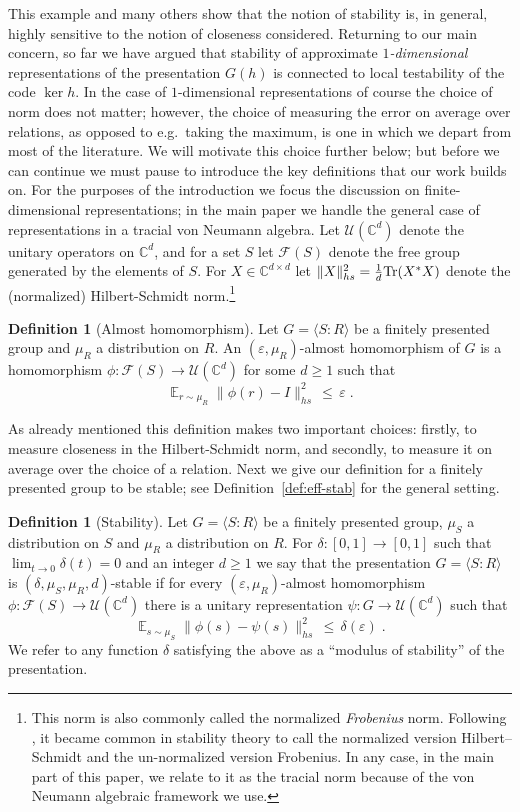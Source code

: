 \documentclass[11pt]{article}
\theoremstyle{definition}
\newtheorem{definition}[theorem]{Definition}
\newcommand{\Tr}{\mbox{\rm Tr}}
\newcommand{\Id}{\ensuremath{I}}
\DeclareMathOperator*{\Expectation}{\mathbb{E}}
\newcommand{\Es}[1]{\Expectation_{#1}}
\newcommand{\C}{\ensuremath{\mathbb{C}}}
\newcommand{\mF}{\ensuremath{\mathcal{F}}}
\newcommand{\mU}{\ensuremath{\mathcal{U}}}
\newcommand{\eps}{\varepsilon}
\begin{document}
This example and many others show that the notion of stability is, in general, highly sensitive to the notion of closeness considered. Returning to our main concern, so far we have argued that 
stability of approximate \emph{$1$-dimensional} representations of the presentation $G(h)$ is connected to local testability of the code $\ker h$. In the case of $1$-dimensional representations of course the choice of norm does not matter; however, the choice of measuring the error on average over relations, as opposed to e.g.\ taking the maximum, is one in which we depart from most of the literature. We will motivate this choice further below; but before we can continue we must pause to introduce the key definitions that our work builds on. For the purposes of the introduction we focus the discussion on finite-dimensional representations; in the main paper we handle the general case of representations in a tracial von Neumann algebra. Let $\mU(\C^d)$ denote the unitary operators on $\C^d$, and for a set $S$ let $\mF(S)$ denote the free group generated by the elements of $S$. For $X\in \C^{d\times d}$ let $\|X\|_{hs}^2 = \frac{1}{d}\Tr(X^* X)$ denote the (normalized) Hilbert-Schmidt norm.\footnote{This norm is also commonly called the normalized \emph{Frobenius} norm. Following \cite{dechiffre_glebsky_lubotzky_thom_2020}, it became common in stability theory to call the normalized version Hilbert--Schmidt and the un-normalized version Frobenius. In any case, in the main part of this paper, we relate to it as the tracial norm because of the von Neumann algebraic framework we use.}

\begin{definition}[Almost homomorphism]\label{def:approx-hom-intro}
Let $G = \langle S:R\rangle $ be a finitely presented group and $\mu_R$ a distribution on $R$. An $(\eps,\mu_R)$-almost homomorphism of $G$ is a homomorphism $\phi:\mF(S)\to\mU(\C^d)$ for some $d\geq 1$ such that
\[ \Es{r\sim \mu_R} \big\|  \phi(r) - \Id \big \|_{hs}^2 \,\leq\, \eps\;.\]
\end{definition}

As already mentioned this definition makes two important choices: firstly, to measure closeness in the Hilbert-Schmidt norm, and secondly, to measure it on average over the choice of a relation. Next we give our definition for a finitely presented group to be stable; see Definition~\ref{def:eff-stab} for the general setting. 

\begin{definition}[Stability]\label{def:eff-stab-intro}
Let $G = \langle S:R\rangle $ be a finitely presented group, $\mu_S$ a distribution on $S$ and $\mu_R$ a distribution on $R$. For $\delta:[0,1]\to[0,1]$ such that $\lim_{t\to 0}\delta(t)=0$ and an integer $d\geq 1$ we say that the presentation $G=\langle S:R\rangle$ is $(\delta,\mu_S,\mu_R,d)$-stable if for every $(\eps,\mu_R)$-almost homomorphism $\phi: \mF(S) \to \mU(\C^d)$ there is a unitary representation $\psi: G \to \mU(\C^d)$ such that
\[ \Es{s\sim \mu_S} \big\|  \phi(s) - \psi(s) \big \|_{hs}^2 \,\leq\, \delta(\eps)\;.\]
We refer to any function $\delta$ satisfying the above as a ``modulus of stability'' of the presentation.
\end{definition}
\end{document}
